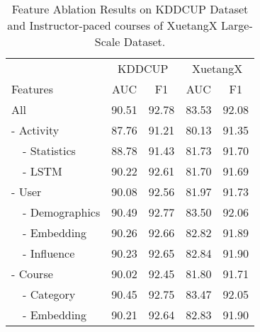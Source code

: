 	
	\begin{table}
		\caption{Feature Ablation Results on KDDCUP Dataset and Instructor-paced courses of XuetangX Large-Scale Dataset.}
		\centering
		\begin{tabular}{llcccc}
		\hline \hline
			&               & \multicolumn{2}{c}{KDDCUP} & \multicolumn{2}{c}{XuetangX} \\
			\multicolumn{2}{l}{Features}                &AUC    & F1   & AUC    & F1   \\ \hline 
			\multicolumn{2}{l}{All}                     & 90.51 & 92.78 & 83.53 & 92.08     \\ \hline
			\multicolumn{2}{l}{- Activity}          &  87.76 & 91.21     &80.13	  &91.35   \\ 
			& - Statistics                            & 88.78 & 91.43    &81.73   & 91.70  \\
			& - LSTM                              & 90.22  & 92.61     & 81.70  & 91.69    \\ \hline
			\multicolumn{2}{l}{- User}           &90.08  &92.56    & 81.97  & 91.73      \\
			& - Demographics                       & 90.49  & 92.77     & 83.50 & 92.06      \\ 
			& - Embedding                            & 90.26  & 92.66     & 82.82  & 91.89  \\ 
			& - Influence                              &   90.23   & 92.65     & 82.84    &91.90  \\ \hline
			\multicolumn{2}{l}{- Course}      & 90.02    & 92.45    & 81.80    & 91.71   \\
			& - Category                              & 90.45       &92.75     &83.47   &92.05   \\ 
			& - Embedding                          &   90.21        &92.64      &82.83  &91.90           \\ \hline \hline
 \end{tabular}

	  \label{tab:featImp}	
	\end{table}

